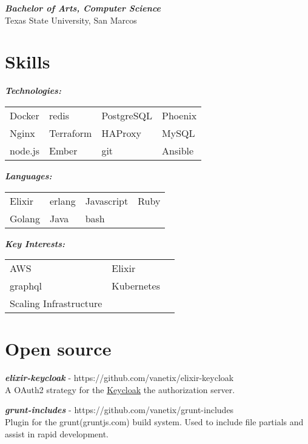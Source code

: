 \documentclass[line,margin]{res}
\begin{document}
\begin{resume}
\textit{\textbf{Bachelor of Arts, Computer Science}} \\
Texas State University, San Marcos

\section{Skills}

\textit{\textbf{Technologies:}} \\
\begin{tabular}{l l l l}
  Docker & redis & PostgreSQL & Phoenix \\
  Nginx & Terraform & HAProxy & MySQL \\
  node.js & Ember & git & Ansible
\end{tabular}

\textit{\textbf{Languages:}} \\
\begin{tabular}{l l l l}
  Elixir & erlang & Javascript & Ruby \\
  Golang & Java & bash
\end{tabular}

\textit{\textbf{Key Interests:}} \\
\begin{tabular}{l l l }
  AWS & Elixir \\
  graphql & Kubernetes \\
  Scaling Infrastructure
\end{tabular}

\section{Open source}

\textit{\textbf{elixir-keycloak}} - https://github.com/vanetix/elixir-keycloak \\
A OAuth2 strategy for the \href{https://www.keycloak.org/}{Keycloak} the authorization server.

\textit{\textbf{grunt-includes}} - https://github.com/vanetix/grunt-includes \\
Plugin for the grunt(gruntjs.com) build system. Used to include file partials and assist in rapid development.

\end{resume}
\end{document}

